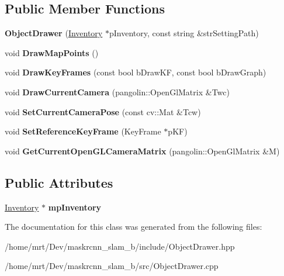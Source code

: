 \subsection*{Public Member Functions}
\begin{DoxyCompactItemize}
\item 
\mbox{\label{classObjectDrawer_ae670d3818a6a95402aba4ccdc90b8fc0}} 
{\bfseries Object\+Drawer} (\hyperlink{classInventory}{Inventory} $\ast$p\+Inventory, const string \&str\+Setting\+Path)
\item 
\mbox{\label{classObjectDrawer_a4e673493a9b2545b199c61b7a5239891}} 
void {\bfseries Draw\+Map\+Points} ()
\item 
\mbox{\label{classObjectDrawer_a02381ea8fad3c699a213dcde13161827}} 
void {\bfseries Draw\+Key\+Frames} (const bool b\+Draw\+KF, const bool b\+Draw\+Graph)
\item 
\mbox{\label{classObjectDrawer_ab86f02d748af2b18d68315cdfeebe13b}} 
void {\bfseries Draw\+Current\+Camera} (pangolin\+::\+Open\+Gl\+Matrix \&Twc)
\item 
\mbox{\label{classObjectDrawer_a64cdd1b62c008509af2151d2d5589c27}} 
void {\bfseries Set\+Current\+Camera\+Pose} (const cv\+::\+Mat \&Tcw)
\item 
\mbox{\label{classObjectDrawer_a9e2c0acae16f47058e82a0c78a5ebe20}} 
void {\bfseries Set\+Reference\+Key\+Frame} (Key\+Frame $\ast$p\+KF)
\item 
\mbox{\label{classObjectDrawer_abf864858f14bd575386e18362b7b8433}} 
void {\bfseries Get\+Current\+Open\+G\+L\+Camera\+Matrix} (pangolin\+::\+Open\+Gl\+Matrix \&M)
\end{DoxyCompactItemize}
\subsection*{Public Attributes}
\begin{DoxyCompactItemize}
\item 
\mbox{\label{classObjectDrawer_a8bddfa20eefe1f70cf7fc5a0b62d7aaa}} 
\hyperlink{classInventory}{Inventory} $\ast$ {\bfseries mp\+Inventory}
\end{DoxyCompactItemize}


The documentation for this class was generated from the following files\+:\begin{DoxyCompactItemize}
\item 
/home/mrt/\+Dev/maskrcnn\+\_\+slam\+\_\+b/include/Object\+Drawer.\+hpp\item 
/home/mrt/\+Dev/maskrcnn\+\_\+slam\+\_\+b/src/Object\+Drawer.\+cpp\end{DoxyCompactItemize}
